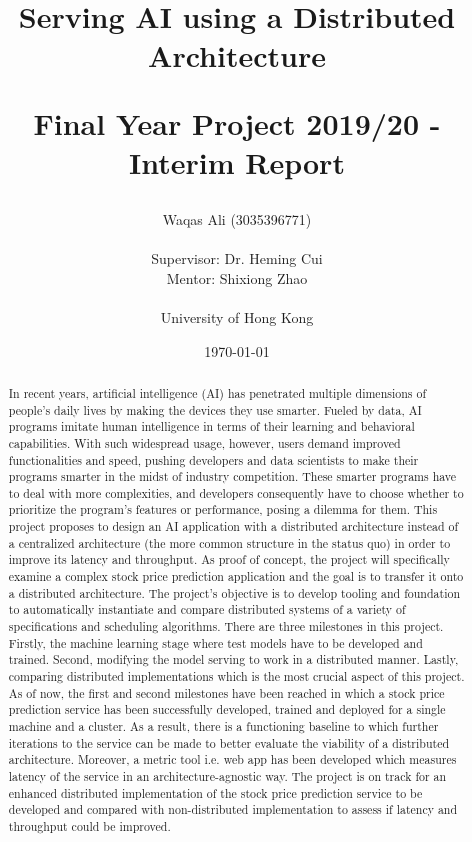 \documentclass{report}
\title{
  Serving AI using a Distributed Architecture \\ 
\begin{large} 
  Final Year Project 2019/20 - Interim Report
\end{large} }
\author{Waqas Ali (3035396771)\\\\Supervisor: Dr. Heming Cui\\Mentor: Shixiong Zhao\\\\University of Hong Kong}
\date{\today}
\def\frontmatter{%
    \pagenumbering{roman}
    \setcounter{page}{1}
    \renewcommand{\thesection}{\Roman{section}}
}%
\begin{document}
\maketitle

\frontmatter

\begin{abstract}
\thispagestyle{plain}

In recent years, artificial intelligence (AI) has penetrated multiple dimensions of people's daily lives by making the devices they use smarter.
Fueled by data, AI programs imitate human intelligence in terms of their learning and behavioral capabilities.
With such widespread usage, however, users demand improved functionalities and speed, pushing developers and data scientists to make their programs smarter in the midst of industry competition.
These smarter programs have to deal with more complexities, and developers consequently have to choose whether to prioritize the program's features or performance, posing a dilemma for them.
This project proposes to design an AI application with a distributed architecture instead of a centralized architecture (the more common structure in the status quo) in order to improve its latency and throughput.
As proof of concept, the project will specifically examine a complex stock price prediction application and the goal is to transfer it onto a distributed architecture.
The project's objective is to develop tooling and foundation to automatically instantiate and compare distributed systems of a variety of specifications and scheduling algorithms.
There are three milestones in this project.
Firstly, the machine learning stage where test models have to be developed and trained.
Second, modifying the model serving to work in a distributed manner.
Lastly, comparing distributed implementations which is the most crucial aspect of this project.
As of now, the first and second milestones have been reached in which a stock price prediction service has been successfully developed, trained and deployed for a single machine and a cluster.
As a result, there is a functioning baseline to which further iterations to the service can be made to better evaluate the viability of a distributed architecture.
Moreover, a metric tool i.e. web app has been developed which measures latency of the service in an architecture-agnostic way.
The project is on track for an enhanced distributed implementation of the stock price prediction service to be developed and compared with non-distributed implementation to assess if latency and throughput could be improved.
\end{abstract}
\end{document}
